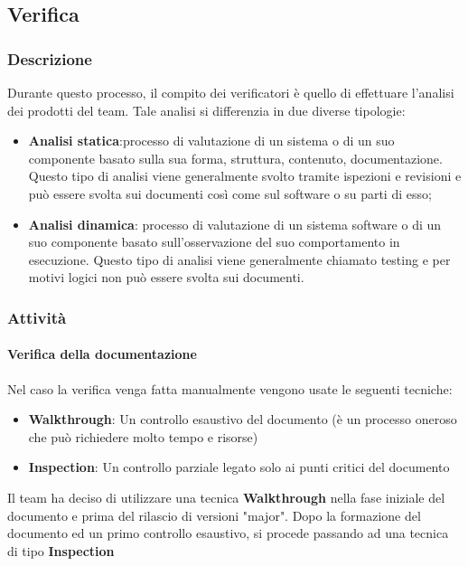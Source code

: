 \documentclass[12pt]{article}
\begin{document}
\label{Verifica}
\subsection{Verifica}
\subsubsection{Descrizione}
Durante questo processo, il compito dei verificatori è quello di effettuare l’analisi dei prodotti del team.
Tale analisi si differenzia in due diverse tipologie:
\begin{itemize}
    \item \textbf{Analisi statica}:processo di valutazione di un sistema o di un suo componente basato sulla sua
          forma, struttura, contenuto, documentazione. Questo tipo di analisi viene generalmente svolto
          tramite ispezioni e revisioni e può essere svolta sui documenti così come sul software o su parti
          di esso;

    \item \textbf{Analisi dinamica}: processo di valutazione di un sistema software o di un suo componente
          basato sull’osservazione del suo comportamento in esecuzione. Questo tipo di analisi viene
          generalmente chiamato testing e per motivi logici non può essere svolta sui documenti.
\end{itemize}

\subsubsection{Attività}
\paragraph{Verifica della documentazione}
\label{VerificaDocumento}
Nel caso la verifica venga fatta manualmente vengono usate le seguenti tecniche:
\begin{itemize}
    \item \textbf{Walkthrough}: Un controllo esaustivo del documento (è un processo oneroso che può richiedere molto tempo e risorse)
    \item \textbf{Inspection}: Un controllo parziale legato solo ai punti critici del documento
\end{itemize}
Il team ha deciso di utilizzare una tecnica \textbf{Walkthrough} nella fase iniziale del documento e prima del rilascio di versioni "major".
Dopo la formazione del documento ed un primo controllo esaustivo, si procede passando ad una tecnica di tipo \textbf{Inspection}
\end{document}
